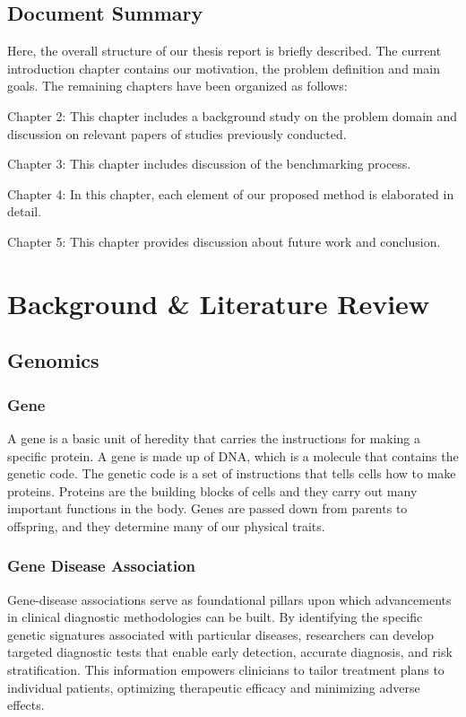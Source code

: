 \section{Document Summary}

Here, the overall structure of our thesis report is briefly described. The current introduction chapter contains our motivation, the problem definition and main goals. The remaining chapters have been organized as follows:

Chapter 2: This chapter includes a background study on the problem domain and discussion on relevant papers of studies previously conducted.

Chapter 3: This chapter includes discussion of the benchmarking process.

Chapter 4: In this chapter, each element of our proposed method is elaborated in detail.

Chapter 5: This chapter provides discussion about future work and conclusion.

\chapter{Background \& Literature Review}


\section{Genomics}


 

\subsection{Gene}

A gene is a basic unit of heredity that carries the instructions for making a specific protein. A gene is made up of DNA, which is a molecule that contains the genetic code. The genetic code is a set of instructions that tells cells how to make proteins. Proteins are the building blocks of cells and they carry out many important functions in the body. Genes are passed down from parents to offspring, and they determine many of our physical traits.

 

\subsection{Gene Disease Association}

Gene-disease associations\cite{1} serve as foundational pillars upon which advancements in clinical diagnostic methodologies can be built. By identifying the specific genetic signatures associated with particular diseases, researchers can develop targeted diagnostic tests that enable early detection, accurate diagnosis, and risk stratification. This information empowers clinicians to tailor treatment plans to individual patients, optimizing therapeutic efficacy and minimizing adverse effects.


